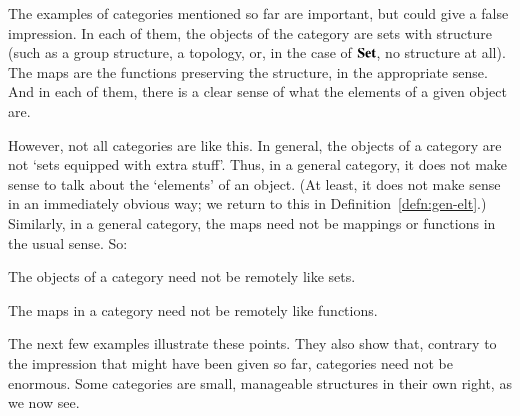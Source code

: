 The examples of categories mentioned so far are important, but could give a
false impression.  In each of them, the objects of the category are sets
with structure (such as a group structure, a topology, or, in the case
of $\mathbf{Set}$, no structure at all).  The maps are the functions preserving the
structure, in the appropriate sense.  And in each of them, there is a
clear sense of what the elements of a given object are.

However, not all categories are like this.  In general, the objects of a
category are not `sets equipped with extra stuff'.  Thus, in a general
category, it does not make sense to talk about the `elements' of an object.
(At least, it does not make sense in an immediately obvious way; we return
to this in Definition~\ref{defn:gen-elt}.)  Similarly, in a general
category, the maps need not be mappings or functions in the usual sense.
So:

\begin{slogan}
The objects of a category need not be remotely like sets.%
%
%
\end{slogan}
%
\begin{slogan}
The maps in a category need not be remotely like functions.
%
%
\end{slogan}
%
The next few examples illustrate these points.  They also show that,
contrary to the impression that might have been given so far, categories
need not be enormous.  Some categories are small, manageable structures in
their own right, as we now see.

